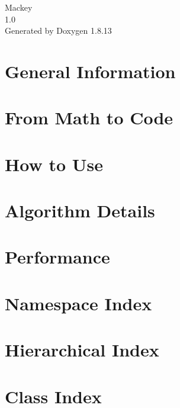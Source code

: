 \documentclass[twoside]{book}
\newcommand{\+}{\discretionary{\mbox{\scriptsize$\hookleftarrow$}}{}{}}
\newcommand{\clearemptydoublepage}{%
  \newpage{\pagestyle{empty}\cleardoublepage}%
}
\begin{document}
\hypersetup{pageanchor=false,
             bookmarksnumbered=true,
             pdfencoding=unicode
            }
\begin{titlepage}
\vspace*{7cm}
\begin{center}%
{\Large Mackey \\[1ex]\large 1.\+0 }\\
\vspace*{1cm}
{\large Generated by Doxygen 1.8.13}\\
\end{center}
\end{titlepage}
\clearemptydoublepage
{}
\tableofcontents
\clearemptydoublepage
{}
\hypersetup{pageanchor=true}

\chapter{General Information}
\label{index}\hypertarget{index}{}
\chapter{From Math to Code}
\label{math}

\chapter{How to Use}
\label{use}

\chapter{Algorithm Details}
\label{algo}

\chapter{Performance}
\label{perf}

\chapter{Namespace Index}

\chapter{Hierarchical Index}

\chapter{Class Index}

\end{document}
